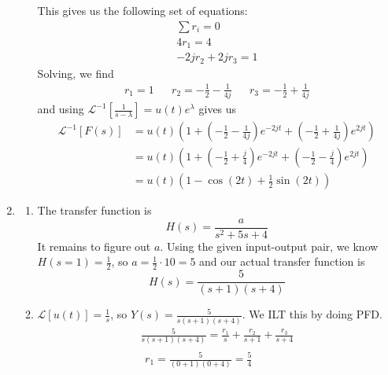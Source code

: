 \documentclass[12pt]{article}
\newcommand{\lt}[1]{\mathcal{L}\left[#1\right]}
\newcommand{\ilt}[1]{\mathcal{L}^{-1}\left[#1\right]}
\begin{document}
\begin{enumerate}
\begin{enumerate}
                        This gives us the following set of equations:
                        \begin{gather*}
                              \sum r_i=0 \\
                              4r_1=4 \\
                              -2jr_2+2jr_3=1
                        \end{gather*}
                        Solving, we find
                        \begin{align*}
                              r_1=1 &  & r_2=-\frac{1}{2}-\frac{1}{4j} &  & r_3=-\frac{1}{2}+\frac{1}{4j}
                        \end{align*}
                        and using $\ilt{\frac{1}{s-\lambda}}=u(t)e^{\lambda}$ gives us
                        \begin{align*}
                              \ilt{F(s)}
                              &=u(t)\left(1+\left(-\frac{1}{2}-\frac{1}{4j}\right)e^{-2jt}+\left(-\frac{1}{2}+\frac{1}{4j}\right)e^{2jt}\right) \\
                              &=u(t)\left(1+\left(-\frac{1}{2}+\frac{j}{4}\right)e^{-2jt}+\left(-\frac{1}{2}-\frac{j}{4}\right)e^{2jt}\right) \\
                              &=u(t)\left(1-\cos(2t)+\frac{1}{2}\sin(2t)\right)
                        \end{align*}
            \end{enumerate}
      \item \begin{enumerate}
                  \item The transfer function is
                        \[H(s)=\frac{a}{s^2+5s+4}\]
                        It remains to figure out $a$.
                        Using the given input-output pair, we know $H(s=1)=\frac{1}{2}$,
                        so $a=\frac{1}{2} \cdot 10=5$ and our actual transfer function is
                        \[\boxed{H(s)=\frac{5}{(s+1)(s+4)}}\]
                  \item $\lt{u(t)}=\frac{1}{s}$, so $Y(s)=\frac{5}{s(s+1)(s+4)}$.
                        We ILT this by doing PFD.
                        \begin{gather*}
                              \frac{5}{s(s+1)(s+4)}=\frac{r_1}{s}+\frac{r_2}{s+1}+\frac{r_3}{s+4} \\
                              \begin{aligned}
                                    r_1=\frac{5}{(0+1)(0+4)}=\frac{5}{4}  &  &

\end{aligned}
\end{gather*}
\end{enumerate}
\end{enumerate}
\end{document}

